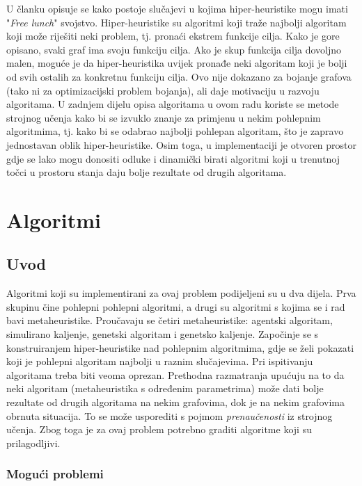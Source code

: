\documentclass[times, utf8, diplomski, numeric]{fer}
\begin{document}
U članku \cite{lit9} opisuje se kako postoje slučajevi u kojima hiper-heuristike mogu imati "\emph{Free lunch}" svojstvo. Hiper-heuristike su algoritmi koji traže najbolji algoritam koji može riješiti neki problem, tj. pronaći ekstrem funkcije cilja. Kako je gore opisano, svaki graf ima svoju funkciju cilja. Ako je skup funkcija cilja dovoljno malen, moguće je da hiper-heuristika uvijek pronađe neki algoritam koji je bolji od svih ostalih za konkretnu funkciju cilja. Ovo nije dokazano za bojanje grafova (tako ni za optimizacijski problem bojanja), ali daje motivaciju u razvoju algoritama. U zadnjem dijelu opisa algoritama u ovom radu koriste se metode strojnog učenja kako bi se izvuklo znanje za primjenu u nekim pohlepnim algoritmima, tj. kako bi se odabrao najbolji pohlepan algoritam, što je zapravo jednostavan oblik hiper-heuristike. Osim toga, u implementaciji je otvoren prostor gdje se lako mogu donositi odluke i dinamički birati algoritmi koji u trenutnoj točci u prostoru stanja daju bolje rezultate od drugih algoritama.

\chapter{Algoritmi}

\section{Uvod}

Algoritmi koji su implementirani za ovaj problem podijeljeni su u dva dijela. Prva skupinu čine pohlepni pohlepni algoritmi, a drugi su algoritmi s kojima se i rad bavi metaheuristike. Proučavaju se četiri metaheuristike: agentski algoritam, simulirano kaljenje, genetski algoritam i genetsko kaljenje. Započinje se s konstruiranjem hiper-heuristike nad pohlepnim algoritmima, gdje se želi pokazati koji je pohlepni algoritam najbolji u raznim slučajevima. Pri ispitivanju algoritama treba biti veoma oprezan. Prethodna razmatranja upućuju na to da neki algoritam (metaheuristika s određenim parametrima) može dati bolje rezultate od drugih algoritama na nekim grafovima, dok je na nekim grafovima obrnuta situacija. To se može usporediti s pojmom \emph{prenaučenosti} iz strojnog učenja. Zbog toga je za ovaj problem potrebno graditi algoritme koji su prilagodljivi.

\subsection{Mogući problemi}
\end{document}
